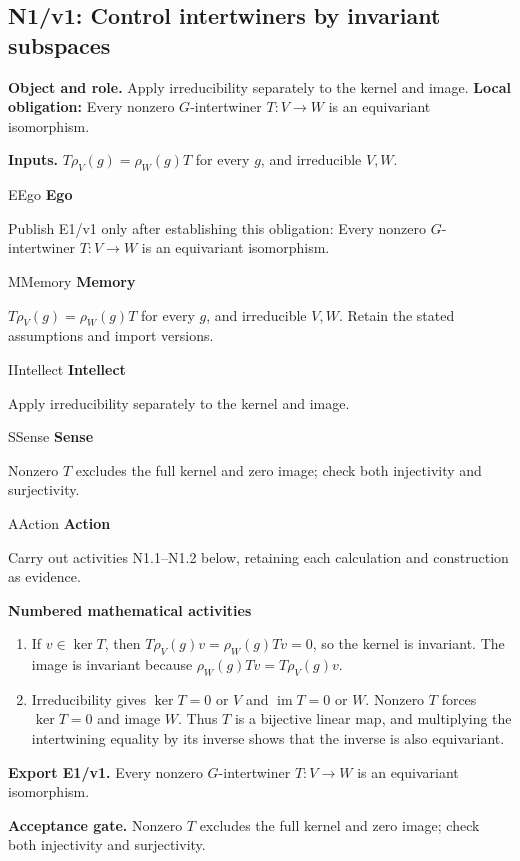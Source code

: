 \documentclass[preprint,12pt,aps,pra,showkeys,amsmath,amssymb,superscriptaddress,floatfix]{revtex4-2}
\theoremstyle{definition}
\theoremstyle{remark}
\newcommand{\mmfaculty}[3]{%
 \begin{mmfacultybox}{#1}{#2}
 {\sffamily\bfseries\color{MMBlue}#2}\par\smallskip #3
 \end{mmfacultybox}}
\newcommand{\field}[2]{\par\smallskip\noindent\textbf{#1.} #2\par}
\begin{document}
\subsection{N1/v1: Control intertwiners by invariant subspaces}

\field{Object and role}{Apply irreducibility separately to the kernel and image. \textbf{Local
obligation:} Every nonzero \(G\)-intertwiner \(T:V\to W\) is an
equivariant isomorphism.}

\field{Inputs}{\(T\rho_V(g)=\rho_W(g)T\) for every \(g\), and irreducible \(V,W\).}

\mmfaculty{E}{Ego}{Publish E1/v1 only after establishing this obligation: Every nonzero
\(G\)-intertwiner \(T:V\to W\) is an equivariant isomorphism.}

\mmfaculty{M}{Memory}{\(T\rho_V(g)=\rho_W(g)T\) for every \(g\), and irreducible \(V,W\).
Retain the stated assumptions and import versions.}

\mmfaculty{I}{Intellect}{Apply irreducibility separately to the kernel and image.}

\mmfaculty{S}{Sense}{Nonzero \(T\) excludes the full kernel and zero image; check both
injectivity and surjectivity.}

\mmfaculty{A}{Action}{Carry out activities N1.1--N1.2 below, retaining each calculation and
construction as evidence.}

\smallskip\noindent\textbf{Numbered mathematical activities}

\begin{enumerate}[label=N1.\arabic*,leftmargin=3.4em]

\item If \(v\in\ker T\), then \(T\rho_V(g)v=\rho_W(g)Tv=0\), so the kernel is
invariant. The image is invariant because \(\rho_W(g)Tv=T\rho_V(g)v\).

\item Irreducibility gives \(\ker T=0\) or \(V\) and \(\operatorname{im}T=0\)
or \(W\). Nonzero \(T\) forces \(\ker T=0\) and image \(W\). Thus \(T\)
is a bijective linear map, and multiplying the intertwining equality by
its inverse shows that the inverse is also equivariant.

\end{enumerate}

\field{Export E1/v1}{Every nonzero \(G\)-intertwiner \(T:V\to W\) is an equivariant
isomorphism.}

\field{Acceptance gate}{Nonzero \(T\) excludes the full kernel and zero image; check both
injectivity and surjectivity.}
\end{document}
